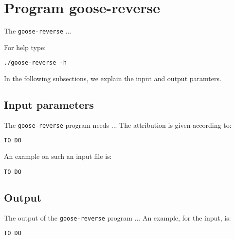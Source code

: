 \section{Program goose-reverse}
The \texttt{goose-reverse} ...

For help type:
\begin{lstlisting}
./goose-reverse -h
\end{lstlisting}
In the following subsections, we explain the input and output paramters.

\subsection{Input parameters}

The \texttt{goose-reverse} program needs ...
The attribution is given according to:
\begin{lstlisting}
TO DO
\end{lstlisting}

An example on such an input file is:
\begin{lstlisting}
TO DO
\end{lstlisting}

\subsection{Output}
The output of the \texttt{goose-reverse} program ...
An example, for the input, is:
\begin{lstlisting}
TO DO
\end{lstlisting}